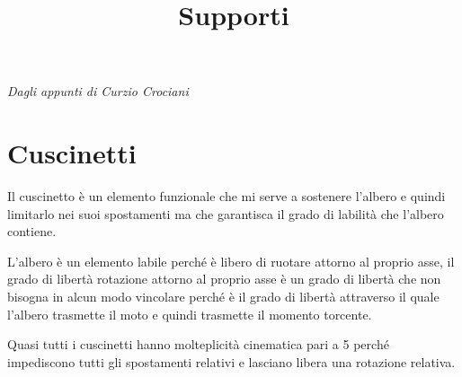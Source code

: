 \documentclass[a4paper, 15pt]{article}
\title{Supporti}
\date{}
\begin{document}
			\maketitle
			\setcounter{tocdepth}{5}  %
			\tableofcontents 
			{\small \textit{Dagli appunti di Curzio Crociani}}
			\newpage
			
			\section{Cuscinetti}
			Il cuscinetto è un elemento funzionale che mi serve a sostenere l’albero e quindi limitarlo nei suoi spostamenti ma che garantisca il grado di labilità che l’albero contiene. \newline
			
			L’albero è un elemento labile perché è libero di ruotare attorno al proprio asse, il grado di libertà rotazione attorno al proprio asse è un grado di libertà che non bisogna in alcun modo vincolare perché è il grado di libertà attraverso il quale l’albero trasmette il moto e quindi trasmette il momento torcente. \newline 
			
			Quasi tutti i cuscinetti hanno molteplicità cinematica pari a 5 perché impediscono tutti gli spostamenti relativi e lasciano libera una rotazione relativa. \newline 
			
\end{document}
